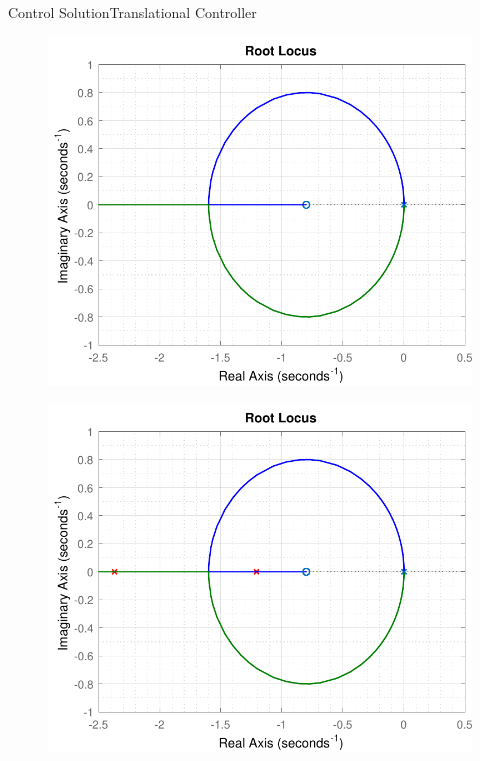 \begin{frame}{Control Solution}{Translational Controller}
{\begin{figure}[H]
      \end{figure}
    }
    {
      \begin{figure}[H]
        \hspace*{-.8cm}
        \includegraphics[width=.7\textwidth]{figures/rootLocusZ4}
      \end{figure}
    }
    {
      \begin{figure}[H]
        \hspace*{-.8cm}
        \includegraphics[width=.7\textwidth]{figures/rootLocusZ5}
      \end{figure}
    }
\end{frame}


